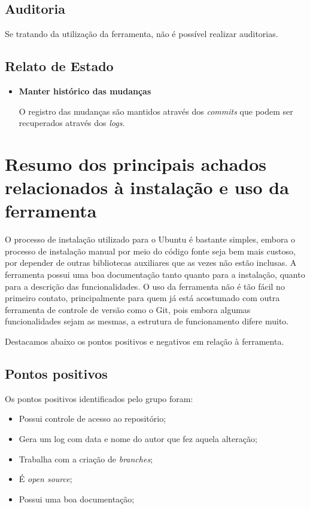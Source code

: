  \subsection{Auditoria}
  
  Se tratando da utilização da ferramenta, não é possível realizar auditorias.
  
 \subsection{Relato de Estado}
 \begin{itemize}
  \item \textbf{Manter histórico das mudanças}
  
  O registro das mudanças são mantidos através dos \textit{commits} que podem ser recuperados através dos \textit{logs}.
  
 \end{itemize}
\section{Resumo dos principais achados relacionados à instalação e uso da ferramenta}

	O processo de instalação utilizado para o Ubuntu é bastante simples, embora o processo de instalação manual por meio do 
	código fonte seja bem mais custoso, por depender de outras bibliotecas auxiliares que as vezes não estão inclusas.
	A ferramenta possui uma boa documentação tanto quanto para a instalação, quanto para a descrição das funcionalidades.
	O uso da ferramenta não é tão fácil no primeiro contato, principalmente para quem já está acostumado com outra ferramenta 
	de controle de versão como o Git, pois embora algumas funcionalidades sejam as mesmas, a estrutura de funcionamento difere muito.

	Destacamos abaixo os pontos positivos e negativos em relação à ferramenta.

	\subsection{Pontos positivos}

			Os pontos positivos identificados pelo grupo foram:

			\begin{itemize}
				\item Possui controle de acesso ao repositório;
				\item Gera um log com data e nome do autor que fez aquela alteração;
				\item Trabalha com a criação de \textit{branches};
				\item É \textit{open source};
				\item Possui uma boa documentação;
			\end{itemize}


